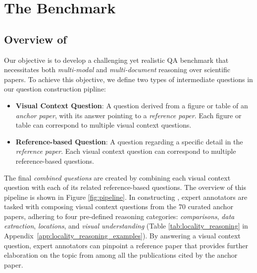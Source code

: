 

\section{The \data Benchmark} 
\subsection{Overview of \data}
\label{sec:overview}


Our objective is to develop a challenging yet realistic QA benchmark that necessitates both \emph{multi-modal} and \emph{multi-document} reasoning over scientific papers. 
%
%
To achieve this objective, we define two types of intermediate questions in our question construction pipline: 
%
% 
\vspace{-0.2em}
\begin{itemize}[leftmargin=*]
    \itemsep0em 
    \item \textbf{Visual Context Question}: A question derived from a figure or table of an \textit{anchor paper}, with its answer pointing to a \textit{reference paper}. Each figure or table can correspond to multiple visual context questions.
    \item \textbf{Reference-based Question}: A question regarding a specific detail in the \textit{reference paper}. Each visual context question can correspond to multiple reference-based questions. 
\end{itemize}
%
The final \textit{combined questions} are created by combining each visual context question with each of its related reference-based questions.
%
The overview of this pipeline is shown in Figure \ref{fig:pipeline}. 
%
In constructing \data, expert annotators are tasked with composing visual context questions from the 70 curated anchor papers, adhering to four pre-defined reasoning categories: \emph{comparisons}, \emph{data extraction}, \emph{locations}, and \emph{visual understanding} (Table \ref{tab:locality_reasoning} in Appendix~\ref{app:locality_reasoning_examples}).
%
By answering a visual context question, expert annotators can pinpoint a reference paper that provides further elaboration on the topic from among all the publications cited by the anchor paper. 
